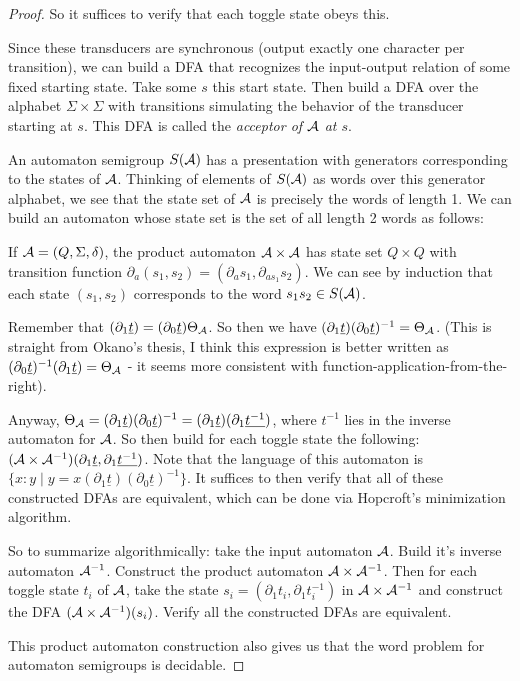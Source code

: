 \documentclass[11pt]{article}
\begin{document}
\begin{proof}
{\color{TODO}
So it suffices to verify that each toggle state obeys this.

Since these transducers are synchronous (output exactly one character
per transition), we can build a DFA that recognizes the input-output
relation of some fixed starting state. Take some $s$ this start
state. Then build a DFA over the alphabet $\Sigma \times \Sigma$ with
transitions simulating the behavior of the transducer starting at
$s$. This DFA is called the \textit{acceptor of $\mathcal{A}$ at $s$}.

An automaton semigroup $S(\mathcal{A})$ has a presentation with generators
corresponding to the states of $\mathcal{A}$. Thinking of elements of $S(\mathcal{A})$ as
words over this generator alphabet, we see that the state set of $\mathcal{A}$
is precisely the words of length 1. We can build an automaton whose
state set is the set of all length 2 words as follows:

If $\mathcal{A} = (Q, \Sigma, \delta)$, the product automaton $\mathcal{A} \times \mathcal{A}$ has
state set $Q\times Q$ with transition function
$\partial_a (s_1, s_2) = (\partial_a s_1, \partial_{a s_1} s_2)$. We
can see by induction that each state $(s_1, s_2)$ corresponds to the
word $s_1 s_2 \in S(\mathcal{A})$.

Remember that
$(\partial_1 \underline{t}) = (\partial_0 \underline{t})\Theta_{\mathcal{A}}$. So
then we have
$(\partial_1 \underline{t})(\partial_0 \underline{t})^{-1} =
\Theta_{\mathcal{A}}$. (This is straight from Okano's thesis, I think this
expression is better written as
$(\partial_0 \underline{t})^{-1}(\partial_1 \underline{t})= \Theta_{\mathcal{A}}$
- it seems more consistent with function-application-from-the-right).

Anyway, $\Theta_{\mathcal{A}} = (\partial_1 \underline{t})(\partial_0 \underline{t})^{-1} = (\partial_1 \underline{t})(\partial_1 \underline{t^{-1}})$, where $t^{-1}$ lies in the inverse automaton for $\mathcal{A}$. So then build for each toggle state the following: $(\mathcal{A}\times \mathcal{A}^{-1})(\partial_1 \underline{t}, \partial_1 \underline{t^{-1}})$. Note that the language of this automaton is $\{ x : y \mid y = x(\partial_1 \underline{t})(\partial_0 \underline{t})^{-1}\}$. It suffices to then verify that all of these constructed DFAs are equivalent, which can be done via Hopcroft's minimization algorithm.

So to summarize algorithmically: take the input automaton $\mathcal{A}$. Build
it's inverse automaton $\mathcal{A}^{-1}$. Construct the product automaton
$\mathcal{A}\times \mathcal{A}^{-1}$. Then for each toggle state $t_i$ of $\mathcal{A}$, take the
state $s_i = (\partial_1 t_i, \partial_1 t_i^{-1})$ in
$\mathcal{A}\times \mathcal{A}^{-1}$ and construct the DFA $(\mathcal{A}\times \mathcal{A}^{-1})(s_i)$. Verify
all the constructed DFAs are equivalent.


This product automaton construction also gives us that the word
problem for automaton semigroups is decidable.
} %
\end{proof}
\end{document}
